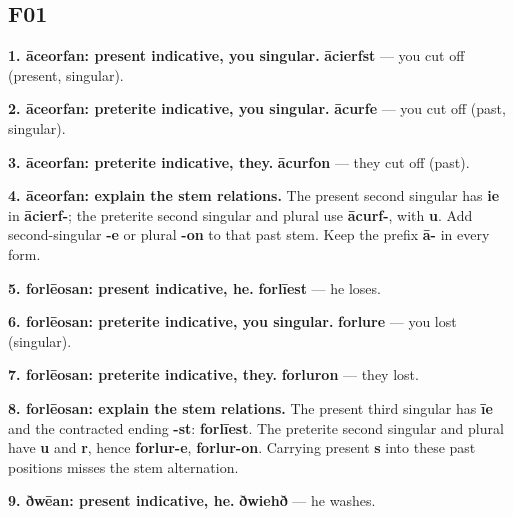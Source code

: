 \subsection*{F01}

\textbf{1. āceorfan: present indicative, you singular.} \textbf{ācierfst} — you cut off (present, singular).

\textbf{2. āceorfan: preterite indicative, you singular.} \textbf{ācurfe} — you cut off (past, singular).

\textbf{3. āceorfan: preterite indicative, they.} \textbf{ācurfon} — they cut off (past).

\textbf{4. āceorfan: explain the stem relations.} The present second singular has \textbf{ie} in \textbf{ācierf-}; the preterite second singular and plural use \textbf{ācurf-}, with \textbf{u}. Add second-singular \textbf{-e} or plural \textbf{-on} to that past stem. Keep the prefix \textbf{ā-} in every form.

\textbf{5. forlēosan: present indicative, he.} \textbf{forlīest} — he loses.

\textbf{6. forlēosan: preterite indicative, you singular.} \textbf{forlure} — you lost (singular).

\textbf{7. forlēosan: preterite indicative, they.} \textbf{forluron} — they lost.

\textbf{8. forlēosan: explain the stem relations.} The present third singular has \textbf{īe} and the contracted ending \textbf{-st}: \textbf{forlīest}. The preterite second singular and plural have \textbf{u} and \textbf{r}, hence \textbf{forlur-e}, \textbf{forlur-on}. Carrying present \textbf{s} into these past positions misses the stem alternation.

\textbf{9. ðwēan: present indicative, he.} \textbf{ðwiehð} — he washes.

